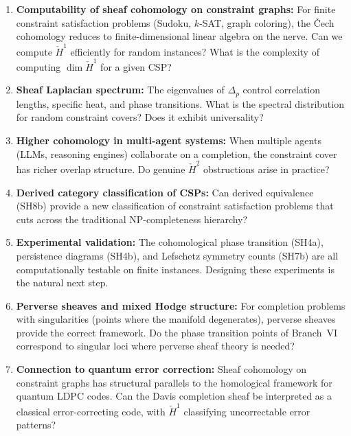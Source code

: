 \documentclass[11pt,letterpaper]{article}
\newcommand{\Hcech}{\check{H}}
\begin{document}
\begin{enumerate}
    \item \textbf{Computability of sheaf cohomology on constraint 
    graphs:} For finite constraint satisfaction problems (Sudoku, 
    $k$-SAT, graph coloring), the \v{C}ech cohomology reduces to 
    finite-dimensional linear algebra on the nerve. Can we compute 
    $\Hcech^1$ efficiently for random instances? What is the 
    complexity of computing $\dim \Hcech^1$ for a given CSP?
    
    \item \textbf{Sheaf Laplacian spectrum:} The eigenvalues of 
    $\Delta_p$ control correlation lengths, specific heat, and phase 
    transitions. What is the spectral distribution for random 
    constraint covers? Does it exhibit universality?
    
    \item \textbf{Higher cohomology in multi-agent systems:} When 
    multiple agents (LLMs, reasoning engines) collaborate on a 
    completion, the constraint cover has richer overlap structure. 
    Do genuine $\Hcech^2$ obstructions arise in practice?
    
    \item \textbf{Derived category classification of CSPs:} Can 
    derived equivalence (SH8b) provide a new classification of 
    constraint satisfaction problems that cuts across the 
    traditional NP-completeness hierarchy?
    
    \item \textbf{Experimental validation:} The cohomological phase 
    transition (SH4a), persistence diagrams (SH4b), and Lefschetz 
    symmetry counts (SH7b) are all computationally testable on 
    finite instances. Designing these experiments is the natural next 
    step.
    
    \item \textbf{Perverse sheaves and mixed Hodge structure:} For 
    completion problems with singularities (points where the manifold 
    degenerates), perverse sheaves provide the correct framework. Do 
    the phase transition points of Branch~VI correspond to singular 
    loci where perverse sheaf theory is needed?
    
    \item \textbf{Connection to quantum error correction:} Sheaf 
    cohomology on constraint graphs has structural parallels to the 
    homological framework for quantum LDPC codes. Can the Davis 
    completion sheaf be interpreted as a classical error-correcting 
    code, with $\Hcech^1$ classifying uncorrectable error patterns?
\end{enumerate}
\end{document}
